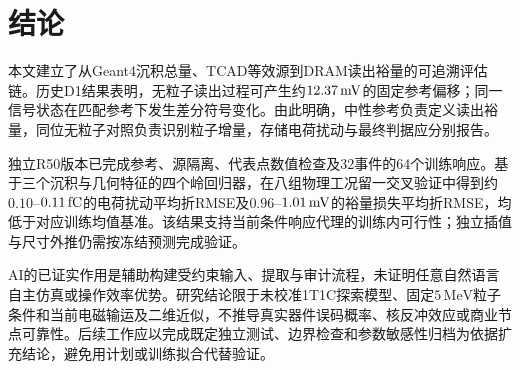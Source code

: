 \section{结论}
本文建立了从Geant4沉积总量、TCAD等效源到DRAM读出裕量的可追溯评估链。历史D1结果表明，无粒子读出过程可产生约$12.37\,\mathrm{mV}$的固定参考偏移；同一信号状态在匹配参考下发生差分符号变化。由此明确，中性参考负责定义读出裕量，同位无粒子对照负责识别粒子增量，存储电荷扰动与最终判据应分别报告。

独立R50版本已完成参考、源隔离、代表点数值检查及32事件的64个训练响应。基于三个沉积与几何特征的四个岭回归器，在八组物理工况留一交叉验证中得到约$0.10$--$0.11\,\mathrm{fC}$的电荷扰动平均折RMSE及$0.96$--$1.01\,\mathrm{mV}$的裕量损失平均折RMSE，均低于对应训练均值基准。该结果支持当前条件响应代理的训练内可行性；独立插值与尺寸外推仍需按冻结预测完成验证。

AI的已证实作用是辅助构建受约束输入、提取与审计流程，未证明任意自然语言自主仿真或操作效率优势。研究结论限于未校准1T1C探索模型、固定$5\,\mathrm{MeV}$粒子条件和当前电磁输运及二维近似，不推导真实器件误码概率、核反冲效应或商业节点可靠性。后续工作应以完成既定独立测试、边界检查和参数敏感性归档为依据扩充结论，避免用计划或训练拟合代替验证。
